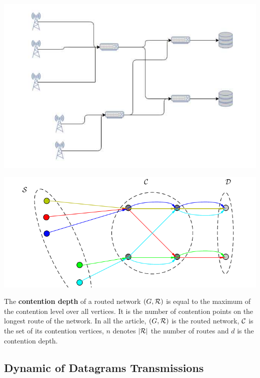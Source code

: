 \documentclass[english]{article}
\begin{document}
\begin{minipage}[c]{.45\linewidth}
	
	
	\includegraphics[scale=0.5]{fronthaul}
\label{fig:fronthaul}

	 \end{minipage}
 \hfill
 \begin{minipage}[c]{.45\linewidth}
	
	
	\includegraphics[scale=0.5]{graphmodel}
\label{fig:graph}

	 \end{minipage}

	The  \textbf{contention depth} of a routed network $(G,{\cal R})$ is equal to the maximum of the contention level over all vertices. It is the number of contention points on the longest route of the network. In all the article, $(G,{\cal R})$ is the routed network, ${\cal C}$ is the set of its contention vertices, $n$ denotes $|\cal{R}|$ the number of routes and $d$ is the contention depth.  


 \subsection{Dynamic of Datagrams Transmissions}
	    
\end{document}
